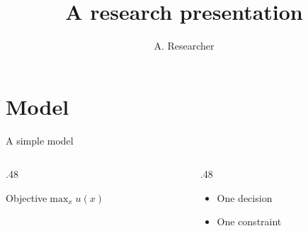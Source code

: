 \documentclass[aspectratio=169]{beamer}
\title{A research presentation}\author{A. Researcher}\date{}
\begin{document}
\frame{\titlepage}
\section{Model}
\begin{frame}{A simple model}
\begin{columns}[T]
\begin{column}{.48\textwidth}\begin{block}{Objective}$\max_x u(x)$\end{block}\end{column}
\begin{column}{.48\textwidth}\begin{itemize}\item One decision\item One constraint\end{itemize}\end{column}
\end{columns}
\end{frame}
\end{document}

